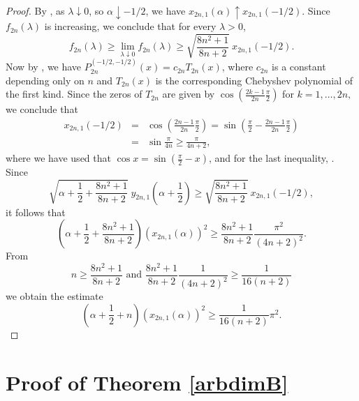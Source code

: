 \documentclass[12pt]{amsart}
\begin{document}
\begin{proof}
By \cite[Theorem 6.21.1]{Szeg39}, as $\lambda \downarrow 0$, so $\alpha \downarrow -1/2$, 
we have $x_{2n,1}\left( \alpha \right) \uparrow x_{2n,1}\left( -1/2 \right)$. Since
$f_{2n}\left( \lambda \right)$ is increasing, we conclude that for every $\lambda > 0$,
\begin{equation*}
f_{2n}\left( \lambda \right) \geq 
\lim_{\lambda \downarrow 0}f_{2n}\left( \lambda \right) 
\ge 
\sqrt{\frac{8n^{2}+1
}{8n+2}} \ x_{2n,1}\left( -1/2 \right).
\end{equation*}
 Now by \cite[pg. 60]{Szeg39}, we have $P_{2n}^{\left( -1/2 , -1/2 \right) }\left(
 x\right) = c_{2n} T_{2n}\left( x\right) $, where $c_{2n}$ is a constant   depending only on $n$ and $T_{2n}\left( x\right) $  is the corresponding Chebyshev
polynomial  of the first kind. Since the zeros of $T_{2n}$
are given by $\cos \left( \frac{2k-1}{2n}\frac{\pi }{2}\right) $ for $%
k=1, \dots , 2n,$ we conclude that 
\begin{eqnarray*}
 x_{2n,1}\left( -1/2 \right) &=&\cos \left( \frac{2n-1}{2n}\frac{\pi }{2}\right)
=\sin \left( \frac{\pi }{2}-\frac{2n-1}{2n}\frac{\pi }{2}\right) \\
&=&\sin \frac{\pi }{4n}\geq \frac{\pi }{4n+2},
\end{eqnarray*}
where we have used that $\cos x=\sin \left( \frac{\pi }{2}-x\right)$,  and  for the last
inequality, \cite[Lemma 14]{RendAl22}.  Since 
\begin{equation*}
\sqrt{\alpha +\frac{1}{2}+\frac{8n^{2}+1}{8n+2}} \ y_{2n,1}\left( \alpha +\frac{1
}{2}\right) 
\ge
\sqrt{\frac{8n^{2}+1
	}{8n+2}} \ x_{2n,1}\left( -1/2 \right),
\end{equation*}
 it follows that 
\begin{equation*}
\left( \alpha +\frac{1}{2}+\frac{8n^{2}+1}{8n+2}\right) \left(
x_{2n,1}\left( \alpha \right) \right) ^{2}\geq \frac{8n^{2}+1}{8n+2}\frac{
\pi ^{2}}{\left( 4n+2\right) ^{2}}.
\end{equation*}
From 
$$
n\geq \frac{8n^{2}+1}{8n+2} \mbox{ \ and  \  } \frac{8n^{2}+1}{8n+2}\frac{1}{
\left( 4n+2\right) ^{2}}\geq \frac{1}{16\left( n+2\right) }
$$
 we obtain the
estimate 
\begin{equation*}
\left( \alpha +\frac{1}{2}+n\right) \left( x_{2n,1}\left( \alpha \right)
\right) ^{2}\geq \frac{1}{16\left( n+2\right) }\pi ^{2}.
\end{equation*}
\end{proof}

\section{Proof of Theorem \ref{arbdimB}}
\end{document}
